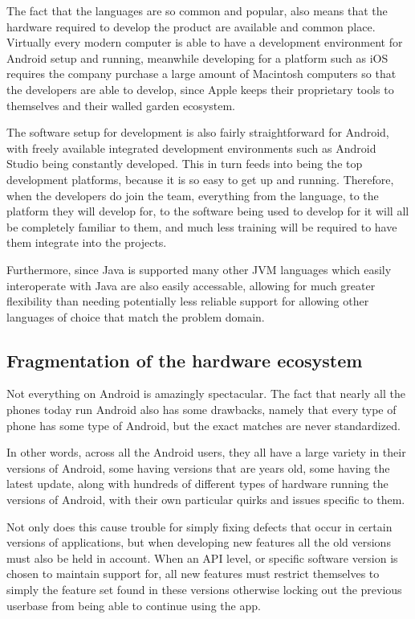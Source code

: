 \documentclass[12pt, letterpaper]{article}
\begin{document}
The fact that the languages are so common and popular, also means that the
hardware required to develop the product are available and common place.
Virtually every modern computer is able to have a development environment
for Android setup and running, meanwhile developing for a platform such as
iOS requires the company purchase a large amount of Macintosh computers
so that the developers are able to develop, since Apple keeps their
proprietary tools to themselves and their walled garden ecosystem.

The software setup for development is also fairly straightforward for
Android, with freely available integrated development environments such
as Android Studio being constantly developed. This in turn feeds into being
the top development platforms, because it is so easy to get up and running.
Therefore, when the developers do join the team, everything from the
language, to the platform they will develop for, to the software being used
to develop for it will all be completely familiar to them, and much less
training will be required to have them integrate into the projects.

Furthermore, since Java is supported many other JVM languages which easily
interoperate with Java are also easily accessable, allowing for much greater
flexibility than needing potentially less reliable support for allowing
other languages of choice that match the problem domain.

\subsection{Fragmentation of the hardware ecosystem}
Not everything on Android is amazingly spectacular. The fact that nearly
all the phones today run Android also has some drawbacks, namely that
every type of phone has some type of Android, but the exact matches are
never standardized.

In other words, across all the Android users, they all have a large variety
in their versions of Android, some having versions that are years old,
some having the latest update, along with hundreds of different types of
hardware running the versions of Android, with their own particular quirks
and issues specific to them.

Not only does this cause trouble for simply fixing defects that occur in
certain versions of applications, but when developing new features all the
old versions must also be held in account. When an API level, or specific
software version is chosen to maintain support for, all new features must
restrict themselves to simply the feature set found in these versions
otherwise locking out the previous userbase from being able to continue
using the app.
\end{document}
